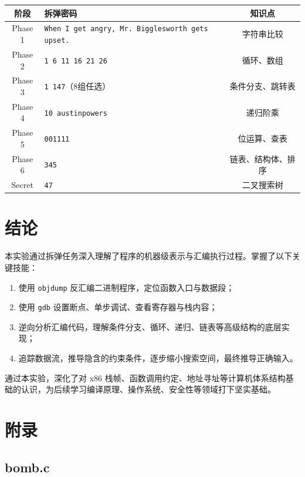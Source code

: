 \documentclass[12pt, a4paper]{academics}
\begin{document}
\begin{center}
\begin{tabular}{|c|p{5cm}|c|}
\hline
\textbf{阶段} & \textbf{拆弹密码} & \textbf{知识点} \\
\hline
Phase 1 & \texttt{When I get angry, Mr. Bigglesworth gets upset.} & 字符串比较 \\
\hline
Phase 2 & \texttt{1 6 11 16 21 26} & 循环、数组 \\
\hline
Phase 3 & \texttt{1 147}（8组任选） & 条件分支、跳转表 \\
\hline
Phase 4 & \texttt{10 austinpowers} & 递归阶乘 \\
\hline
Phase 5 & \texttt{001111} & 位运算、查表 \\
\hline
Phase 6 & \texttt{345} & 链表、结构体、排序 \\
\hline
Secret & \texttt{47} & 二叉搜索树 \\
\hline
\end{tabular}
\end{center}

\section{结论}

本实验通过拆弹任务深入理解了程序的机器级表示与汇编执行过程。掌握了以下关键技能：

\begin{enumerate}
    \item 使用 \texttt{objdump} 反汇编二进制程序，定位函数入口与数据段；
    \item 使用 \texttt{gdb} 设置断点、单步调试、查看寄存器与栈内容；
    \item 逆向分析汇编代码，理解条件分支、循环、递归、链表等高级结构的底层实现；
    \item 追踪数据流，推导隐含的约束条件，逐步缩小搜索空间，最终推导正确输入。
\end{enumerate}

通过本实验，深化了对 x86 栈帧、函数调用约定、地址寻址等计算机体系结构基础的认识，为后续学习编译原理、操作系统、安全性等领域打下坚实基础。

\appendix
\section{附录}

\subsection{bomb.c}

\inputminted{c}{../res/bomb.c}
\end{document}
